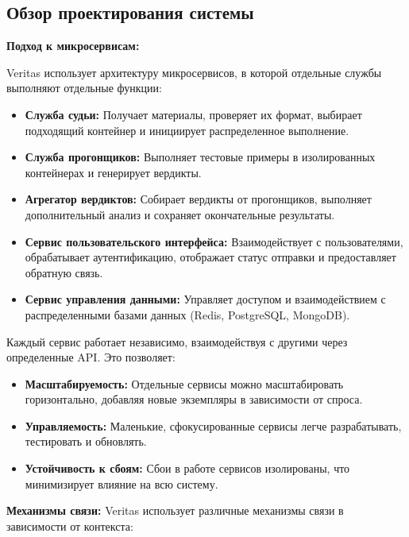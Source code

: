 \subsection{Обзор проектирования системы}

\textbf{Подход к микросервисам:}
\noindent

Veritas использует архитектуру микросервисов, в которой отдельные службы выполняют отдельные функции:
\noindent
\begin{itemize}
    \itemsep 0em
    \item \textbf{Служба судьи:} \noindent Получает материалы, проверяет их формат, выбирает подходящий контейнер и инициирует распределенное выполнение.
    \item \textbf{Служба прогонщиков:} \noindent Выполняет тестовые примеры в изолированных контейнерах и генерирует вердикты.
    \item \textbf{Агрегатор вердиктов:} \noindent Собирает вердикты от прогонщиков, выполняет дополнительный анализ и сохраняет окончательные результаты.
    \item \textbf{Сервис пользовательского интерфейса:} \noindent Взаимодействует с пользователями, обрабатывает аутентификацию, отображает статус отправки и предоставляет обратную связь.
    \item \textbf{Сервис управления данными:} \noindent Управляет доступом и взаимодействием с распределенными базами данных (Redis, PostgreSQL, MongoDB).
\end{itemize}

\noindent
Каждый сервис работает независимо, взаимодействуя с другими через определенные API. Это позволяет:

\begin{itemize}
    \itemsep 0em
    \item \textbf{Масштабируемость:} \noindent Отдельные сервисы можно масштабировать горизонтально, добавляя новые экземпляры в зависимости от спроса.
    \item \textbf{Управляемость:} \noindent Маленькие, сфокусированные сервисы легче разрабатывать, тестировать и обновлять.
    \item \textbf{Устойчивость к сбоям:} \noindent Сбои в работе сервисов изолированы, что минимизирует влияние на всю систему.
\end{itemize}


\textbf{Механизмы связи:} \noindent Veritas использует различные механизмы связи в зависимости от контекста:

